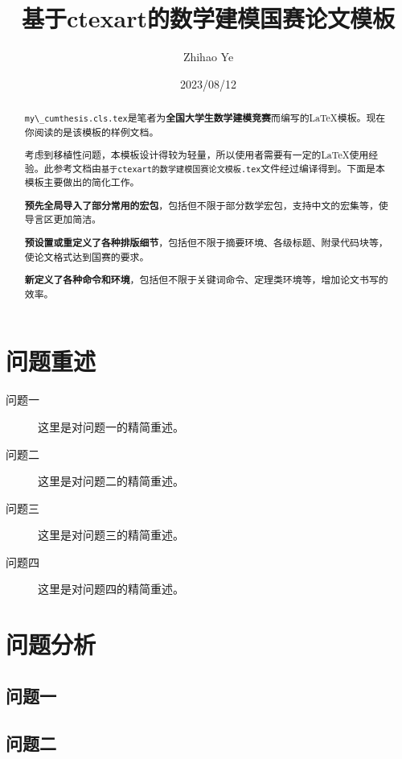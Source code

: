 \documentclass[nogbt]{my_cumcmthesis}
\title{基于ctexart的数学建模国赛论文模板} %
\author{Zhihao Ye} %
\date{2023/08/12} %
\begin{document}
\maketitle %
\begin{abstract}
    \colorbox{gray!15}{\lstinline!my\_cumthesis.cls.tex!}是笔者为\textbf{全国大学生数学建模竞赛}而编写的\LaTeX{}模板。现在你阅读的是该模板的样例文档。
    
    考虑到移植性问题，本模板设计得较为轻量，所以使用者需要有一定的\LaTeX{}使用经验。此参考文档由\colorbox{gray!15}{\lstinline!基于ctexart的数学建模国赛论文模板.tex!}文件经过\XeLaTeX{}编译得到。下面是本模板主要做出的简化工作。

    \textbf{预先全局导入了部分常用的宏包}，包括但不限于\AmS{}部分数学宏包，支持中文的\CTeX{}宏集等，使导言区更加简洁。

    \textbf{预设置或重定义了各种排版细节}，包括但不限于摘要环境、各级标题、附录代码块等，使论文格式达到国赛的要求。

    \textbf{新定义了各种命令和环境}，包括但不限于关键词命令、定理类环境等，增加论文书写的效率。

\end{abstract}

\section{问题重述}

\begin{description}
    \item[问题一] 这里是对问题一的精简重述。
    \item[问题二] 这里是对问题二的精简重述。
    \item[问题三] 这里是对问题三的精简重述。
    \item[问题四] 这里是对问题四的精简重述。
\end{description}

\section{问题分析}
\subsection{问题一}
    \zhlipsum[1] %
\subsection{问题二}
    \zhlipsum[2] %
\end{document}

